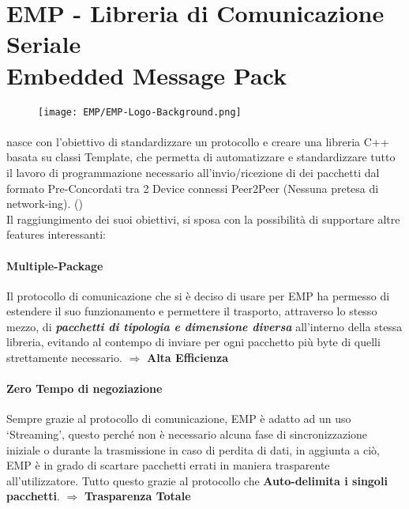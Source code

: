 \newpage

\section*{EMP - Libreria di Comunicazione Seriale\\Embedded Message Pack }\label{sec:EMP}

\begin{figure}[h]
	\centering
	\texttt{[image: EMP/EMP-Logo-Background.png]}
\end{figure}
\paragraph{} nasce con l’obiettivo di standardizzare un protocollo e creare una libreria C++ basata su classi Template, che permetta di automatizzare e standardizzare tutto il lavoro di programmazione necessario all’invio/ricezione di dei pacchetti dal formato Pre-Concordati tra 2 Device connessi Peer2Peer (Nessuna pretesa di network-ing). (\cite*{EMP})\\
Il raggiungimento dei suoi obiettivi, si sposa con la possibilità di supportare altre features interessanti:

\paragraph{Multiple-Package} Il protocollo di comunicazione che si è deciso di usare per EMP ha permesso di estendere il suo funzionamento e permettere il trasporto, attraverso lo stesso mezzo, di \textit{\textbf{pacchetti di tipologia e dimensione diversa}} all’interno della stessa libreria, evitando al contempo di inviare per ogni pacchetto più byte di quelli strettamente necessario. $\Rightarrow$ \textbf{Alta Efficienza}

\paragraph{Zero Tempo di negoziazione} Sempre grazie al protocollo di comunicazione, EMP è adatto ad un uso ‘Streaming’, questo perché non è necessario alcuna fase di sincronizzazione iniziale o durante la trasmissione in caso di perdita di dati, in aggiunta a ciò, EMP è in grado di scartare pacchetti errati in maniera trasparente all’utilizzatore. Tutto questo grazie al protocollo che \textbf{Auto-delimita i singoli pacchetti}. $\Rightarrow$ \textbf{Trasparenza Totale}

